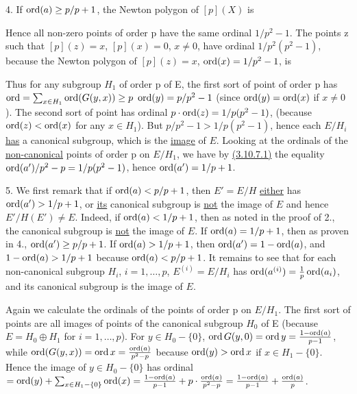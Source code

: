 \begin{kaproof}
4. If $\operatorname{ord}(a)\geq p/p+1$, the Newton polygon of $[p](X)$ is
\begin{center}
\end{center}
Hence all non-zero points of order p have the same ordinal $1/p^2-1$. The
points z such that $[p](z) = x$, $[p](x) = 0$, $x\neq 0$, have ordinal
$1/p^2(p^2-1)$, because the Newton polygon of $[p](z) = x$,
$\operatorname{ord}(x) = 1/p^2-1$, is
\begin{center}
\end{center}
Thus for any subgroup $H_1$ of order p of E, the first sort of point of order
p has $\operatorname{ord} = \sum_{x\in H_1} \operatorname{ord}(G(y,x))\geq p\ \operatorname{ord}(y) = p/p^2-1$ (since
$\operatorname{ord}(y) = \operatorname{ord}(x)$ if $x\neq 0$). The second sort of point has ordinal
$p\cdot\operatorname{ord}(z) = 1/p(p^2-1)$, (because $\operatorname{ord}(z)<\operatorname{ord}(x)$ for any $x\in H_1$).
But $p/p^2-1>1/p(p^2-1)$, hence each $E/H_i$ \uline{has} a canonical subgroup,
which is the \uline{image} of $E$. Looking at the ordinals of the
\uline{non-canonical} points of order p on $E/H_1$, we have by \hyperref[ka:3.10.7]{(3.10.7.1)} the
equality $\operatorname{ord}(a')/p^2-p = 1/p(p^2-1)$, hence $\operatorname{ord}(a') = 1/p+1$.

5. We first remark that if $\operatorname{ord}(a)<p/p+1$, then $E' = E/H$ \uline{either}
has $\operatorname{ord}(a')>1/p+1$, or \uline{its} canonical subgroup is \uline{not} the
image of $E$ and hence $E'/H(E')\neq E$. Indeed, if $\operatorname{ord}(a)<1/p+1$, then as
noted in the proof of 2., the canonical subgroup is \uline{not} the image of
$E$. If $\operatorname{ord}(a) = 1/p+1$, then as proven in 4., $\operatorname{ord}(a')\geq p/p+1$. If
$\operatorname{ord}(a)>1/p+1$, then $\operatorname{ord}(a') = 1-\operatorname{ord}(a)$, and $1-\operatorname{ord}(a)>1/p+1$ because
$\operatorname{ord}(a)<p/p+1$. It remains to see that for each non-canonical subgroup $H_i$,
$i=1,\dots,p$, $E^{(i)} = E/H_i$ has $\operatorname{ord}(a^{(i)}) = \frac{1}{p}\operatorname{ord}(a_i)$,
and its canonical subgroup is the image of $E$.

Again we calculate the ordinals of the points of order p on $E/H_1$. The first
sort of points are all images of points of the canonical subgroup $H_0$ of E
(because $E = H_0\oplus H_1$ for $i=1,\dots,p$). For $y\in H_0-\{0\}$,
$\operatorname{ord} G(y,0) = \operatorname{ord} y = \frac{1-\operatorname{ord}(a)}{p-1}$, while
$\operatorname{ord}(G(y,x)) = \operatorname{ord} x = \frac{\operatorname{ord}(a)}{p^2-p}$ because $\operatorname{ord}(y)>\operatorname{ord} x$ if
$x\in H_1-\{0\}$. Hence the image of $y\in H_0-\{0\}$ has ordinal
$= \operatorname{ord}(y) + \sum_{x\in H_1-\{0\}} \operatorname{ord}(x) = \frac{1-\operatorname{ord}(a)}{p-1} +
p\cdot\frac{\operatorname{ord}(a)}{p^2-p} = \frac{1-\operatorname{ord}(a)}{p-1} + \frac{\operatorname{ord}(a)}{p}$.


\end{kaproof}
